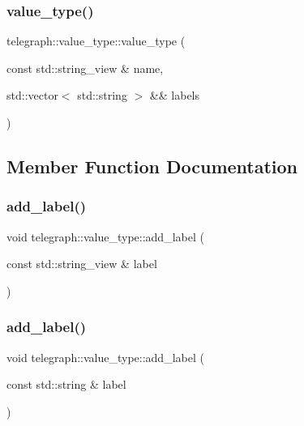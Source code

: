 \subsubsection{\texorpdfstring{value\+\_\+type()}{value\_type()}\hspace{0.1cm}{\footnotesize\ttfamily [4/4]}}
{\footnotesize\ttfamily telegraph\+::value\+\_\+type\+::value\+\_\+type (\begin{DoxyParamCaption}\item[{const std\+::string\+\_\+view \&}]{name,  }\item[{std\+::vector$<$ std\+::string $>$ \&\&}]{labels }\end{DoxyParamCaption})\hspace{0.3cm}{\ttfamily [inline]}}



\subsection{Member Function Documentation}
\mbox{\label{classtelegraph_1_1value__type_afcf8bd9842356bc6818b986fe3cf6025}} 
\subsubsection{\texorpdfstring{add\+\_\+label()}{add\_label()}\hspace{0.1cm}{\footnotesize\ttfamily [1/2]}}
{\footnotesize\ttfamily void telegraph\+::value\+\_\+type\+::add\+\_\+label (\begin{DoxyParamCaption}\item[{const std\+::string\+\_\+view \&}]{label }\end{DoxyParamCaption})\hspace{0.3cm}{\ttfamily [inline]}}

\mbox{\label{classtelegraph_1_1value__type_ac591946a9956e9429457ee198fb565c1}} 
\subsubsection{\texorpdfstring{add\+\_\+label()}{add\_label()}\hspace{0.1cm}{\footnotesize\ttfamily [2/2]}}
{\footnotesize\ttfamily void telegraph\+::value\+\_\+type\+::add\+\_\+label (\begin{DoxyParamCaption}\item[{const std\+::string \&}]{label }\end{DoxyParamCaption})\hspace{0.3cm}{\ttfamily [inline]}}

